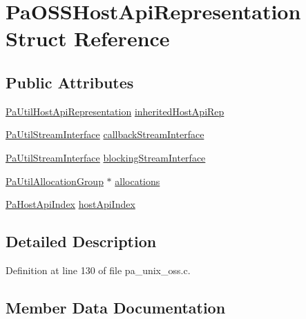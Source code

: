 \hypertarget{struct_pa_o_s_s_host_api_representation}{}\section{Pa\+O\+S\+S\+Host\+Api\+Representation Struct Reference}
\label{struct_pa_o_s_s_host_api_representation}
\subsection*{Public Attributes}
\begin{DoxyCompactItemize}
\item 
\hyperlink{struct_pa_util_host_api_representation}{Pa\+Util\+Host\+Api\+Representation} \hyperlink{struct_pa_o_s_s_host_api_representation_ac41d15472e8618ce2a600232b1d5a898}{inherited\+Host\+Api\+Rep}
\item 
\hyperlink{struct_pa_util_stream_interface}{Pa\+Util\+Stream\+Interface} \hyperlink{struct_pa_o_s_s_host_api_representation_ad69a240ffe51786e65a14f9f004d7793}{callback\+Stream\+Interface}
\item 
\hyperlink{struct_pa_util_stream_interface}{Pa\+Util\+Stream\+Interface} \hyperlink{struct_pa_o_s_s_host_api_representation_a95f6c2c3b94b920664c06014c68bbfc6}{blocking\+Stream\+Interface}
\item 
\hyperlink{struct_pa_util_allocation_group}{Pa\+Util\+Allocation\+Group} $\ast$ \hyperlink{struct_pa_o_s_s_host_api_representation_a415955a7a7bc861ff215e58958f23184}{allocations}
\item 
\hyperlink{portaudio_8h_aeef6da084c57c70aa94be97411e19930}{Pa\+Host\+Api\+Index} \hyperlink{struct_pa_o_s_s_host_api_representation_adf310f504bc17e4642a1acee89379d61}{host\+Api\+Index}
\end{DoxyCompactItemize}


\subsection{Detailed Description}


Definition at line 130 of file pa\+\_\+unix\+\_\+oss.\+c.



\subsection{Member Data Documentation}
